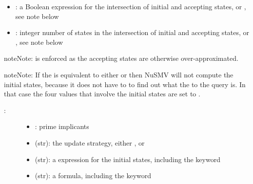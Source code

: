 \documentclass[letterpaper,10pt,english]{sphinxmanual}
\begin{document}
\begin{fulllineitems}
\begin{description}
\begin{itemize}
\item {} 
: a Boolean expression for the intersection of initial and accepting states, or , see note below

\item {} 
: integer number of states in the intersection of initial and accepting states, or , see note below

\end{itemize}

\end{description}

\begin{sphinxadmonition}{note}{Note:}
 is enforced as the accepting states are otherwise over-approximated.
\end{sphinxadmonition}

\begin{sphinxadmonition}{note}{Note:}
If the  is equivalent to either  or  then NuSMV will not compute the initial states,
because it does not have to to find out what the  to the query is.
In that case the four values that involve the initial states are set to .
\end{sphinxadmonition}
\begin{description}
\item[{:}] \leavevmode\begin{itemize}
\item {} 
: prime implicants

\item {} 
 (str): the update strategy, either ,  or 

\item {} 
 (str): a {\hyperref[\detokenize{Installation:installation-nusmv}]{}} expression for the initial states, including the keyword 

\item {} 
 (str): a {\hyperref[\detokenize{Installation:installation-nusmv}]{}} formula, including the keyword 


\end{itemize}
\end{description}
\end{fulllineitems}
\end{document}

